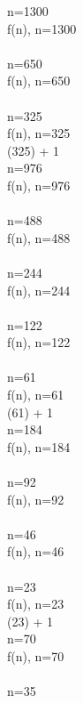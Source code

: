 \documentclass{article}
\begin{document}
 \Rightarrow n=1300
 \\[3mm] 
f(n), n=1300
 \\ 
 \Rightarrow {} 
 \\ 
 \Rightarrow n=650
 \\[3mm] 
f(n), n=650
 \\ 
 \Rightarrow {} 
 \\ 
 \Rightarrow n=325
 \\[3mm] 
f(n), n=325
 \\ 
 (325) + 1
 \\ 
 \Rightarrow n=976
 \\[3mm] 
f(n), n=976
 \\ 
 \Rightarrow {} 
 \\ 
 \Rightarrow n=488
 \\[3mm] 
f(n), n=488
 \\ 
 \Rightarrow {} 
 \\ 
 \Rightarrow n=244
 \\[3mm] 
f(n), n=244
 \\ 
 \Rightarrow {} 
 \\ 
 \Rightarrow n=122
 \\[3mm] 
f(n), n=122
 \\ 
 \Rightarrow {} 
 \\ 
 \Rightarrow n=61
 \\[3mm] 
f(n), n=61
 \\ 
 (61) + 1
 \\ 
 \Rightarrow n=184
 \\[3mm] 
f(n), n=184
 \\ 
 \Rightarrow {} 
 \\ 
 \Rightarrow n=92
 \\[3mm] 
f(n), n=92
 \\ 
 \Rightarrow {} 
 \\ 
 \Rightarrow n=46
 \\[3mm] 
f(n), n=46
 \\ 
 \Rightarrow {} 
 \\ 
 \Rightarrow n=23
 \\[3mm] 
f(n), n=23
 \\ 
 (23) + 1
 \\ 
 \Rightarrow n=70
 \\[3mm] 
f(n), n=70
 \\ 
 \Rightarrow {} 
 \\ 
 \Rightarrow n=35
 \\[3mm] 
\end{document}

